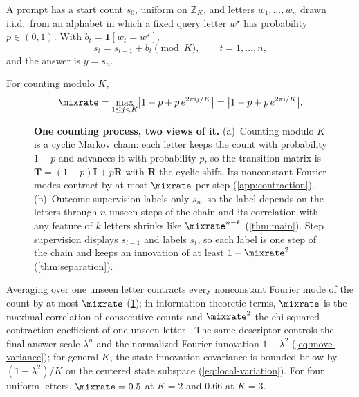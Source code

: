 \begin{definition}
\label{def:task}
A prompt has a start count $s_0$, uniform on $\mathbb Z_K$, and letters $w_1,\ldots,w_n$ drawn i.i.d.\ from an alphabet
in which a fixed query letter $w^\star$ has probability $p\in(0,1)$. With $b_t=\mathbf 1[w_t=w^\star]$,
\begin{equation}
 s_t=s_{t-1}+b_t\pmod K,\qquad t=1,\ldots,n,
 \label{eq:tracking}
\end{equation}
and the answer is $y=s_n$.
\end{definition}

\begin{definition}
\label{def:lambda}
For counting modulo $K$,
\begin{equation}
 \mixrate=\max_{1\le j<K}\bigl|1-p+p\,e^{2\pi\mathrm ij/K}\bigr|=\bigl|1-p+p\,e^{2\pi\mathrm i/K}\bigr|.
 \label{eq:lambda}
\end{equation}
\end{definition}

\begin{figure}[t]
\centering
\resizebox{\linewidth}{!}{}
\caption{\textbf{One counting process, two views of it.}
(a)~Counting modulo $K$ is a cyclic Markov chain: each letter keeps the count with probability $1-p$ and advances it with probability
$p$, so the transition matrix is $\mathbf T=(1-p)\mathbf I+p\mathbf R$ with $\mathbf R$ the cyclic shift. Its nonconstant Fourier modes
contract by at most $\mixrate$ per step (\cref{app:contraction}).
(b)~Outcome supervision labels only $s_n$, so the label depends on the letters through $n$ unseen steps of the chain and its
correlation with any feature of $k$ letters shrinks like $\mixrate^{n-k}$ (\cref{thm:main}). Step supervision displays $s_{t-1}$ and labels $s_t$, so each label is one
step of the chain and keeps an innovation of at least $1-\mixrate^2$ (\cref{thm:separation}).}
\label{fig:chain}
\end{figure}

Averaging over one unseen letter contracts every nonconstant Fourier mode of the count by at most $\mixrate$ (\cref{fig:chain}); in information-theoretic terms,
$\mixrate$ is the maximal correlation of consecutive counts and $\mixrate^2$ the chi-squared contraction coefficient of one
unseen letter \citep{witsenhausen1975sequences,raginsky2016strong}.
The same descriptor controls the final-answer scale $\lambda^n$ and the
normalized Fourier innovation $1-\lambda^2$ (\cref{eq:move-variance}); for general
$K$, the state-innovation covariance is bounded below by
$(1-\lambda^2)/K$ on the centered state subspace (\cref{eq:local-variation}).
For four uniform letters,
$\mixrate=0.5$ at $K=2$ and $0.66$ at $K=3$.

